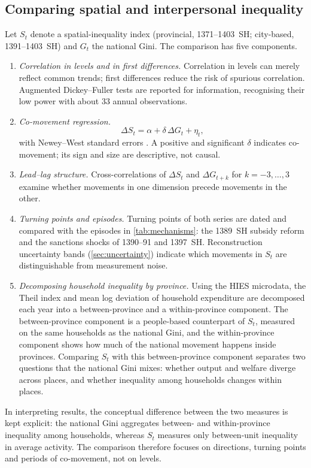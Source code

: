 \documentclass[11pt,a4paper]{article}
\begin{document}
\subsection{Comparing spatial and interpersonal inequality}\label{sec:comparison}

Let $S_t$ denote a spatial-inequality index (provincial, 1371--1403~SH; city-based, 1391--1403~SH) and $G_t$ the national Gini. The comparison has five components.
\begin{enumerate}[label=(\roman*)]
\item \emph{Correlation in levels and in first differences.} Correlation in levels can merely reflect common trends; first differences reduce the risk of spurious correlation. Augmented Dickey--Fuller tests are reported for information, recognising their low power with about 33 annual observations.
\item \emph{Co-movement regression.}
\begin{equation}
\Delta S_t = \alpha + \delta\,\Delta G_t + \eta_t,
\label{eq:comove}
\end{equation}
with Newey--West standard errors \citep{NeweyWest1987}. A positive and significant $\delta$ indicates co-movement; its sign and size are descriptive, not causal.
\item \emph{Lead--lag structure.} Cross-correlations of $\Delta S_t$ and $\Delta G_{t+k}$ for $k=-3,\ldots,3$ examine whether movements in one dimension precede movements in the other.
\item \emph{Turning points and episodes.} Turning points of both series are dated and compared with the episodes in \cref{tab:mechanisms}: the 1389~SH subsidy reform and the sanctions shocks of 1390--91 and 1397~SH. Reconstruction uncertainty bands (\cref{sec:uncertainty}) indicate which movements in $S_t$ are distinguishable from measurement noise.
\item \emph{Decomposing household inequality by province.} Using the HIES microdata, the Theil index and mean log deviation of household expenditure are decomposed each year into a between-province and a within-province component. The between-province component is a people-based counterpart of $S_t$, measured on the same households as the national Gini, and the within-province component shows how much of the national movement happens inside provinces. Comparing $S_t$ with this between-province component separates two questions that the national Gini mixes: whether output and welfare diverge across places, and whether inequality among households changes within places.
\end{enumerate}
In interpreting results, the conceptual difference between the two measures is kept explicit: the national Gini aggregates between- and within-province inequality among households, whereas $S_t$ measures only between-unit inequality in average activity. The comparison therefore focuses on directions, turning points and periods of co-movement, not on levels.
\end{document}
